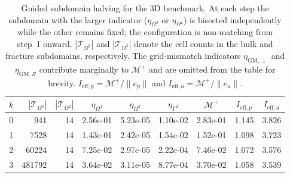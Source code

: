 \begin{table}[tbp]
    \caption{Guided subdomain halving for the 3D benchmark. At each step the subdomain with the larger indicator ($\eta_{\Omega^3}$ or $\eta_{\Omega^2}$) is bisected independently while the other remains fixed; the configuration is non-matching from step~1 onward. $|\mathcal{T}_{\Omega^3}|$ and $|\mathcal{T}_{\Omega^2}|$ denote the cell counts in the bulk and fracture subdomains, respectively. The grid-mismatch indicators $\eta_{\mathrm{GM},\perp}$ and $\eta_{\mathrm{GM},R}$ contribute marginally to $\mathcal{M}^+$ and are omitted from the table for brevity. $I_{\mathrm{eff},p} = \mathcal{M}^+ / \|e_p\|$ and $I_{\mathrm{eff},u} = \mathcal{M}^+ / \|e_u\|$.}
    \label{tab:guided_halving}
    \centering
    \begin{tabular}{r r r c c c c c c}
        \toprule
        $k$ & $|\mathcal{T}_{\Omega^3}|$ & $|\mathcal{T}_{\Omega^2}|$ & $\eta_{\Omega^3}$ & $\eta_{\Omega^2}$ & $\eta_{\Gamma^2}$ & $\mathcal{M}^+$ & $I_{\mathrm{eff},p}$ & $I_{\mathrm{eff},u}$ \\
        \midrule
        0 & 941 & 14 & 2.56e-01 & 5.23e-05 & 1.10e-02 & 2.83e-01 & 1.145 & 3.826 \\
        1 & 7528 & 14 & 1.43e-01 & 2.42e-05 & 1.54e-02 & 1.52e-01 & 1.098 & 3.723 \\
        2 & 60224 & 14 & 7.25e-02 & 2.97e-05 & 2.22e-04 & 7.46e-02 & 1.072 & 3.576 \\
        3 & 481792 & 14 & 3.64e-02 & 3.11e-05 & 8.77e-04 & 3.70e-02 & 1.058 & 3.539 \\
        \bottomrule
    \end{tabular}
\end{table}